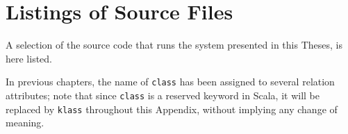 \chapter{Listings of Source Files}
\label{ch:source}

A selection of the source code that runs the system presented in this Theses, is here listed.

In previous chapters, the name of \texttt{class} has been assigned to several relation attributes; note that since \texttt{class} is a reserved keyword in Scala, it will be replaced by \texttt{klass} throughout this Appendix, without implying any change of meaning.





\lstset{style=mystyle}



